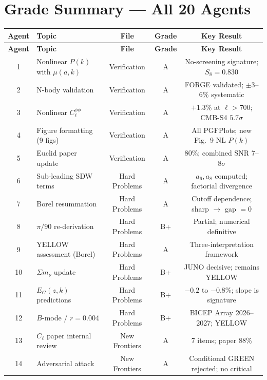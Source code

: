 \documentclass[11pt,a4paper]{article}
\begin{document}
\section{Grade Summary --- All 20 Agents}
\label{sec:grades}

\begin{center}
\begin{longtable}{clccc}
\toprule
\textbf{Agent} & \textbf{Topic} & \textbf{File} & \textbf{Grade} & \textbf{Key Result} \\
\midrule
\endfirsthead
\toprule
\textbf{Agent} & \textbf{Topic} & \textbf{File} & \textbf{Grade} & \textbf{Key Result} \\
\midrule
\endhead
1 & Nonlinear $P(k)$ with $\mu(a,k)$ & Verification & A & No-screening signature; $S_8 = 0.830$ \\
2 & N-body validation & Verification & A & FORGE validated; $\pm 3$--$6\%$ systematic \\
3 & Nonlinear $C_\ell^{\phi\phi}$ & Verification & A & $+1.3\%$ at $\ell > 700$; CMB-S4 $5.7\sigma$ \\
4 & Figure formatting (9 figs) & Verification & A & All PGFPlots; new Fig.~9 NL $P(k)$ \\
5 & Euclid paper update & Verification & A & 80\%; combined SNR $7$--$8\sigma$ \\
\midrule
6 & Sub-leading SDW terms & Hard Problems & A & $a_6, a_8$ computed; factorial divergence \\
7 & Borel resummation & Hard Problems & A & Cutoff dependence; sharp $\to$ gap $= 0$ \\
8 & $\pi/90$ re-derivation & Hard Problems & B+ & Partial; numerical definitive \\
9 & YELLOW assessment (Borel) & Hard Problems & A & Three-interpretation framework \\
10 & $\Sigma m_\nu$ update & Hard Problems & B+ & JUNO decisive; remains YELLOW \\
11 & $E_G(z,k)$ predictions & Hard Problems & B+ & $-0.2$ to $-0.8\%$; slope is signature \\
12 & $B$-mode / $r = 0.004$ & Hard Problems & B+ & BICEP Array 2026--2027; YELLOW \\
\midrule
13 & $C_\ell$ paper internal review & New Frontiers & A & 7 items; paper 88\% \\
14 & Adversarial attack & New Frontiers & A & Conditional GREEN rejected; no critical \\

\end{longtable}
\end{center}
\end{document}
